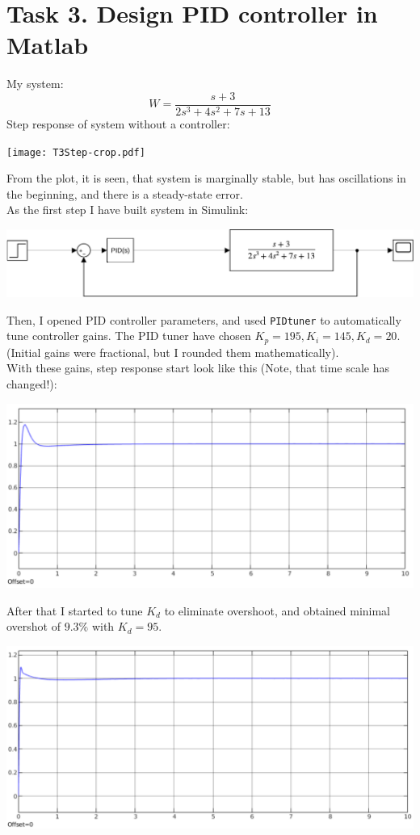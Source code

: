\documentclass[a4paper,12pt]{article}
\begin{document}
\section{Task 3. Design PID controller in Matlab}
    My system:
    \begin{equation*}
        W = \frac{s+3}{2s^3+4s^2+7s+13}
    \end{equation*}
    Step response of system without a controller:
    \begin{center}
        \texttt{[image: T3Step-crop.pdf]}
    \end{center}
    From the plot, it is seen, that system is marginally stable, but has oscillations
    in the beginning, and there is a steady-state error.\\
    As the first step I have built system in Simulink:
    \begin{center}
        \includegraphics[width=\linewidth]{../Task3/System.pdf}
    \end{center}
    Then, I opened PID controller parameters, and used \texttt{PIDtuner} to automatically
    tune controller gains. The PID tuner have chosen $K_p = 195, K_i = 145, K_d = 20$.
    (Initial gains were fractional, but I rounded them mathematically).\\
    With these gains, step response start look like this (Note, that time scale 
    has changed!):
    \begin{center}
        \includegraphics[width=\linewidth]{../Task3/Auto_tuned.pdf}
    \end{center} 
    After that I started to tune $K_d$ to eliminate overshoot, and obtained minimal
    overshot of $9.3\%$ with $K_d = 95$. 
    \begin{center}
        \includegraphics[width=\linewidth]{../Task3/tuned.pdf}
    \end{center}
\end{document}
